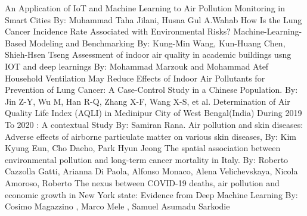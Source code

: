 \documentclass[conference]{IEEEtran}
\begin{document}
\begin{thebibliography}{00}
 An Application of IoT and Machine Learning to Air Pollution Monitoring in Smart Cities By: Muhammad Taha Jilani, Husna Gul A.Wahab
  How Is the Lung Cancer Incidence Rate Associated with Environmental Risks? Machine-Learning-Based Modeling and Benchmarking By: Kung-Min Wang, Kun-Huang Chen, Shieh-Hsen Tseng
Assessment of indoor air quality in academic buildings usng IOT and deep learnings By: Mohammad Marzouk and Mohammad Atef
 Household Ventilation May Reduce Effects of Indoor Air Pollutants for Prevention of Lung Cancer: A Case-Control Study in a Chinese Population. By: Jin Z-Y, Wu M, Han R-Q, Zhang X-F, Wang X-S, et al.
 Determination of Air Quality Life Index (AQLI) in Medinipur City of West Bengal(India) During 2019 To 2020 : A contextual Study By: Samiran Rana.
 Air pollution and skin diseases: Adverse effects of airborne particulate matter on various skin diseases, By: Kim Kyung Eun, Cho Daeho, Park Hyun Jeong
 The spatial association between environmental pollution and long-term cancer mortality in
Italy. By: Roberto Cazzolla Gatti, Arianna Di Paola, Alfonso Monaco, Alena Velichevskaya, Nicola Amoroso, Roberto
The nexus between COVID-19 deaths, air pollution and economic growth in New York state: Evidence from Deep Machine Learning By: Cosimo Magazzino , Marco Mele , Samuel Asumadu Sarkodie
\end{thebibliography}
\vspace{12pt}
\end{document}
